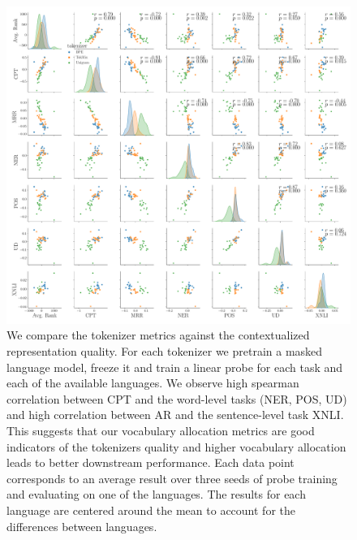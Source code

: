 

\begin{figure}[H]
    \centering
    \includegraphics[width=\textwidth]{paper/figures/pair_analysis_20L.pdf}
    \caption{We compare the tokenizer metrics against the contextualized representation quality. For each tokenizer we pretrain a masked language model, freeze it and train a linear probe for each task and each of the available languages. We observe high spearman correlation between CPT and the word-level tasks (NER, POS, UD) and high correlation between AR and the sentence-level task XNLI. This suggests that our vocabulary allocation metrics are good indicators of the tokenizers quality and higher vocabulary allocation leads to better downstream performance. Each data point corresponds to an average result over three seeds of probe training and evaluating on one of the languages. The results for each language are centered around the mean to account for the differences between languages.}
    \label{fig:pair_analysis_20L}
\end{figure}

